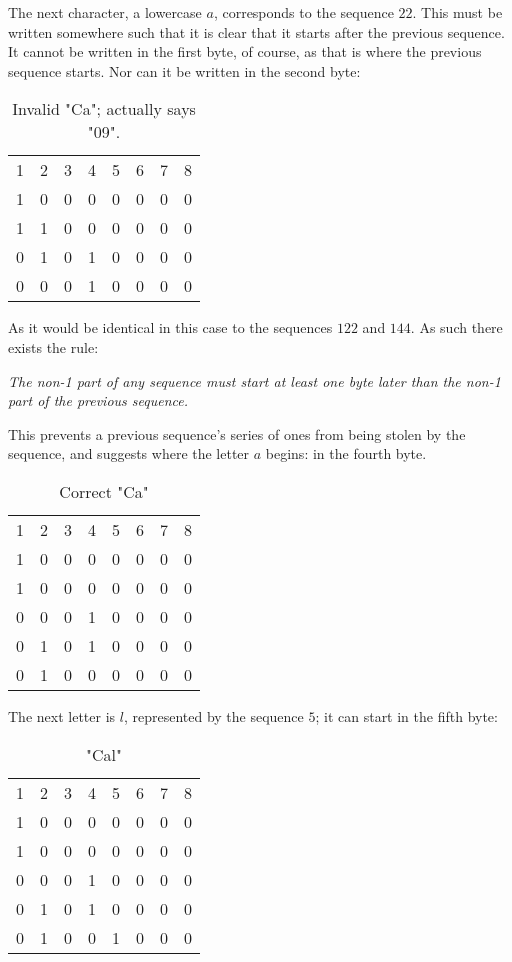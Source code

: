 \documentclass{article}
\begin{document}
The next character, a lowercase $a$, corresponds to the sequence $22$.  This must be written somewhere such that it is clear that it starts after the previous sequence.  It cannot be written in the first byte, of course, as that is where the previous sequence starts.  Nor can it be written in the second byte:
\begin{table}
    \centering
    \begin{tabular}{cccccccc}
        1 & 2 & 3 & 4 & 5 & 6 & 7 & 8\\
        1 & 0 & 0 & 0 & 0 & 0 & 0 & 0\\
        1 & 1 & 0 & 0 & 0 & 0 & 0 & 0\\
        0 & 1 & 0 & 1 & 0 & 0 & 0 & 0\\
        0 & 0 & 0 & 1 & 0 & 0 & 0 & 0\\
    \end{tabular}
    \caption{Invalid "Ca"; actually says "09".}
    \label{tab:my_label}
\end{table}

As it would be identical in this case to the sequences $122$ and $144$.  As such there exists the rule:

\emph{The non-1 part of any sequence must start at least one byte later than the non-1 part of the previous sequence.}

This prevents a previous sequence's series of ones from being stolen by the sequence, and suggests where the letter $a$ begins:  in the fourth byte.

\begin{table}
    \centering
    \begin{tabular}{cccccccc}
        1 & 2 & 3 & 4 & 5 & 6 & 7 & 8\\
        1 & 0 & 0 & 0 & 0 & 0 & 0 & 0\\
        1 & 0 & 0 & 0 & 0 & 0 & 0 & 0\\
        0 & 0 & 0 & 1 & 0 & 0 & 0 & 0\\
        0 & 1 & 0 & 1 & 0 & 0 & 0 & 0\\
        0 & 1 & 0 & 0 & 0 & 0 & 0 & 0\\
    \end{tabular}
    \caption{Correct "Ca"}
    \label{tab:my_label}
\end{table}

The next letter is $l$, represented by the sequence $5$; it can start in the fifth byte:

\begin{table}
    \centering
    \begin{tabular}{cccccccc}
        1 & 2 & 3 & 4 & 5 & 6 & 7 & 8\\
        1 & 0 & 0 & 0 & 0 & 0 & 0 & 0\\
        1 & 0 & 0 & 0 & 0 & 0 & 0 & 0\\
        0 & 0 & 0 & 1 & 0 & 0 & 0 & 0\\
        0 & 1 & 0 & 1 & 0 & 0 & 0 & 0\\
        0 & 1 & 0 & 0 & 1 & 0 & 0 & 0\\
    \end{tabular}
    \caption{"Cal"}
    \label{tab:my_label}
\end{table}
\end{document}
